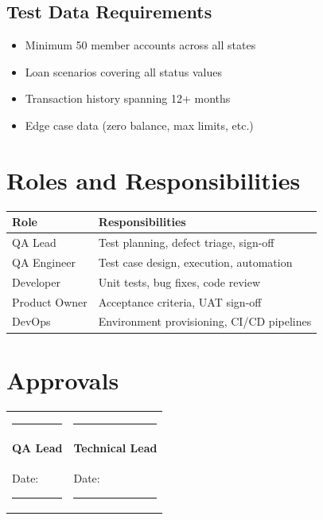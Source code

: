 \documentclass[11pt,a4paper]{article}
\begin{document}
\subsection{Test Data Requirements}
\begin{itemize}
    \item Minimum 50 member accounts across all states
    \item Loan scenarios covering all status values
    \item Transaction history spanning 12+ months
    \item Edge case data (zero balance, max limits, etc.)
\end{itemize}

\section{Roles and Responsibilities}

\begin{tabular}{@{}p{4cm}p{9cm}@{}}
\toprule
\textbf{Role} & \textbf{Responsibilities} \\
\midrule
QA Lead & Test planning, defect triage, sign-off \\
QA Engineer & Test case design, execution, automation \\
Developer & Unit tests, bug fixes, code review \\
Product Owner & Acceptance criteria, UAT sign-off \\
DevOps & Environment provisioning, CI/CD pipelines \\
\bottomrule
\end{tabular}

\section{Approvals}

\vspace{1cm}

\begin{tabular}{@{}p{6cm}p{6cm}@{}}
\rule{5cm}{0.4pt} & \rule{5cm}{0.4pt} \\
\textbf{QA Lead} & \textbf{Technical Lead} \\
Date: \rule{3cm}{0.4pt} & Date: \rule{3cm}{0.4pt} \\
\end{tabular}
\end{document}
